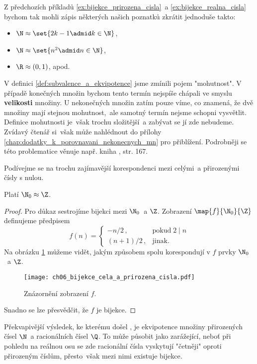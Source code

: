 Z předchozích příkladů \ref{ex:bijekce_prirozena_cisla}~a \ref{ex:bijekce_realna_cisla} bychom tak mohli zápis některých našich poznatků zkrátit jednoduše takto:
\begin{itemize}
    \item $\N\approx\set{2k-1\admid k\in\N}$,
    \item $\N\approx\set{n^2\admid n\in\N}$,
    \item $\R\approx(0,1)$, apod.
\end{itemize}
V definici \ref{def:subvalence_a_ekvipotence} jsme zmínili pojem "mohutnost". V případě konečných množin bychom tento termín nejspíše chápali ve smyslu \textbf{velikosti} množiny. U nekonečných množin zatím pouze víme, co znamená, že dvě množiny mají stejnou mohutnost,~ale samotný termín nejsme schopni vysvětlit. Definice mohutnosti je~však trochu složitější~a zabývat se jí zde nebudeme. Zvídavý čtenář si~však může nahlédnout do přílohy \ref{chap:dodatky_k_porovnavani_nekonecnych_mn} pro přiblížení. Podrobněji se této problematice věnuje např. kniha \cite{Potter2009}, str. 167.\par
Podívejme se na trochu zajímavější korespondenci mezi celými~a přirozenými čísly s nulou.
\begin{theorem}\label{thm:N_a_Z}
    Platí $\N_0\approx\Z$.
\end{theorem}
\begin{proof}
    Pro důkaz sestrojíme bijekci mezi $\N_0$~a $\Z$. Zobrazení $\map{f}{\N_0}{\Z}$ definujeme předpisem
    \begin{equation*}
        f(n)=\left\{
        \begin{array}{ll}
            -n/2\,, & \text{pokud}\;2\mid n\\
            (n+1)/2\,, & \text{jinak}.
        \end{array}
        \right.
    \end{equation*}
    Na obrázku \ref{fig:bijekce_cela_a_prirozena_cisla} můžeme vidět, jakým způsobem spolu korespondují v $f$ prvky $\N_0$~a $\Z$.
    \begin{figure}[H]
        \centering
        \texttt{[image: ch06\_bijekce\_cela\_a\_prirozena\_cisla.pdf]}
        \caption{Znázornění zobrazení $f$.}
        \label{fig:bijekce_cela_a_prirozena_cisla}
    \end{figure}
    Snadno se lze přesvědčit, že $f$ je bijekce.
\end{proof}
Překvapivější výsledek, ke kterému došel , je ekvipotence množiny přirozených čísel $\N$~a racionálních čísel $\Q$. To může působit jako zarážející, neboť při pohledu na reálnou osu se zde racionální čísla vyskytují "četněji" oproti přirozeným číslům, přesto~však mezi nimi existuje bijekce.
